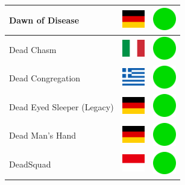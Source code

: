 \documentclass[12pt, a4paper, twoside]{report}
\begin{document}
\begin{center}
\begin{longtable}{|p{5cm}|p{2cm}|p{2cm}|}
 Dawn of Disease                                            & \includegraphics[width=1cm]{../img/flags/de} &   \includegraphics[width=1cm]{../likes/y} \\ \hline
 Dead Chasm                                                 & \includegraphics[width=1cm]{../img/flags/it} &   \includegraphics[width=1cm]{../likes/y} \\ \hline
 Dead Congregation                                          & \includegraphics[width=1cm]{../img/flags/gr} &   \includegraphics[width=1cm]{../likes/y} \\ \hline
 Dead Eyed Sleeper (Legacy)                                 & \includegraphics[width=1cm]{../img/flags/de} &   \includegraphics[width=1cm]{../likes/y} \\ \hline
 Dead Man's Hand                                            & \includegraphics[width=1cm]{../img/flags/de} &   \includegraphics[width=1cm]{../likes/y} \\ \hline
 DeadSquad                                                  & \includegraphics[width=1cm]{../img/flags/id} &   \includegraphics[width=1cm]{../likes/y} \\ \hline

\end{longtable}
\end{center}
\end{document}

